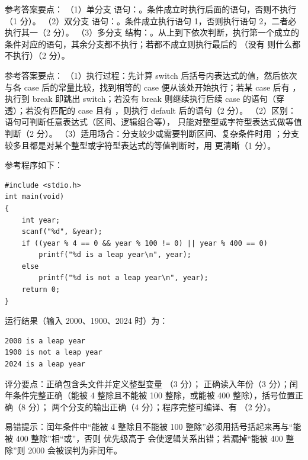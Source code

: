 \documentclass[a4paper,11pt]{article}
\begin{document}
\q 参考答案要点：
（1）单分支  语句：。条件成立时执行后面的语句，否则不执行（1 分）。
（2）双分支  语句：。条件成立执行语句 1，否则执行语句 2，二者必执行其一（2 分）。
（3）多分支  结构：。从上到下依次判断，执行第一个成立的条件对应的语句，其余分支都不执行；若都不成立则执行最后的 （没有  则什么都不执行）（2 分）。

\q 参考答案要点：
（1）执行过程：先计算 switch 后括号内表达式的值，然后依次与各 case 后的常量比较，找到相等的 case 便从该处开始执行；若某 case 后有 ，执行到 break 即跳出 switch；若没有 break 则继续执行后续 case 的语句（穿透）；若没有匹配的 case 且有 ，则执行 default 后的语句（2 分）。
（2）区别： 语句可判断任意表达式（区间、逻辑组合等）， 只能对整型或字符型表达式做等值判断（2 分）。
（3）适用场合：分支较少或需要判断区间、复杂条件时用 ；分支较多且都是对某个整型或字符型表达式的等值判断时，用  更清晰（1 分）。


\q 参考程序如下：
\begin{lstlisting}[language={[custom]C}]
#include <stdio.h>
int main(void)
{
    int year;
    scanf("%d", &year);
    if ((year % 4 == 0 && year % 100 != 0) || year % 400 == 0)
        printf("%d is a leap year\n", year);
    else
        printf("%d is not a leap year\n", year);
    return 0;
}
\end{lstlisting}
\begin{analysis}运行结果（输入 2000、1900、2024 时）为：
\begin{lstlisting}
2000 is a leap year
1900 is not a leap year
2024 is a leap year
\end{lstlisting}
评分要点：正确包含头文件并定义整型变量 （3 分）； 正确读入年份（3 分）；闰年条件完整正确（能被 4 整除且不能被 100 整除，或能被 400 整除），括号位置正确（8 分）； 两个分支的输出正确（4 分）；程序完整可编译、有 （2 分）。\end{analysis}
\begin{analysis}易错提示：闰年条件中“能被 4 整除且不能被 100 整除”必须用括号括起来再与“能被 400 整除”相“或”，否则 \code{\&\&} 优先级高于 \code{||} 会使逻辑关系出错；若漏掉“能被 400 整除”则 2000 会被误判为非闰年。\end{analysis}
\end{document}
